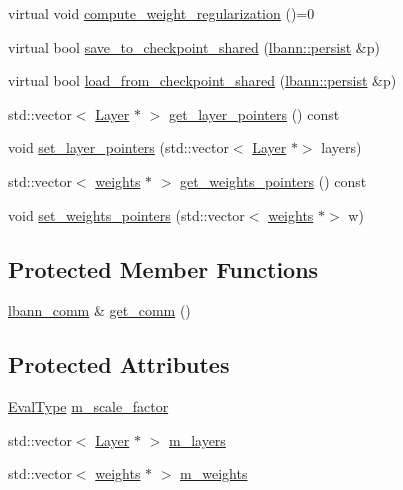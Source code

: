 \begin{DoxyCompactItemize}
\item 
virtual void \hyperlink{classlbann_1_1objective__function__term_a134cf89caed45527bbe9d811a0b93dfc}{compute\+\_\+weight\+\_\+regularization} ()=0
\item 
virtual bool \hyperlink{classlbann_1_1objective__function__term_a4451a6a6fb4d70ac2aed2827f075cd71}{save\+\_\+to\+\_\+checkpoint\+\_\+shared} (\hyperlink{classlbann_1_1persist}{lbann\+::persist} \&p)
\item 
virtual bool \hyperlink{classlbann_1_1objective__function__term_aac2240c9925c2b7bf436072a24f3eb30}{load\+\_\+from\+\_\+checkpoint\+\_\+shared} (\hyperlink{classlbann_1_1persist}{lbann\+::persist} \&p)
\item 
std\+::vector$<$ \hyperlink{classlbann_1_1Layer}{Layer} $\ast$ $>$ \hyperlink{classlbann_1_1objective__function__term_aeeb85314738bec6e15877f68b3d422a0}{get\+\_\+layer\+\_\+pointers} () const
\item 
void \hyperlink{classlbann_1_1objective__function__term_a82656dfd81bf6b818b38d041d341bc3b}{set\+\_\+layer\+\_\+pointers} (std\+::vector$<$ \hyperlink{classlbann_1_1Layer}{Layer} $\ast$$>$ layers)
\item 
std\+::vector$<$ \hyperlink{classlbann_1_1weights}{weights} $\ast$ $>$ \hyperlink{classlbann_1_1objective__function__term_aea73505aed191bfb9336d9d46a69d586}{get\+\_\+weights\+\_\+pointers} () const
\item 
void \hyperlink{classlbann_1_1objective__function__term_aa8adaf01dd8bc535dd86f27fc53c276a}{set\+\_\+weights\+\_\+pointers} (std\+::vector$<$ \hyperlink{classlbann_1_1weights}{weights} $\ast$$>$ w)
\end{DoxyCompactItemize}
\subsection*{Protected Member Functions}
\begin{DoxyCompactItemize}
\item 
\hyperlink{classlbann_1_1lbann__comm}{lbann\+\_\+comm} \& \hyperlink{classlbann_1_1objective__function__term_a5f89b676a26a6b76ddc26563ac87beb9}{get\+\_\+comm} ()
\end{DoxyCompactItemize}
\subsection*{Protected Attributes}
\begin{DoxyCompactItemize}
\item 
\hyperlink{base_8hpp_a3266f5ac18504bbadea983c109566867}{Eval\+Type} \hyperlink{classlbann_1_1objective__function__term_a59a544b8ff0455ed5091de3bf0d81c3c}{m\+\_\+scale\+\_\+factor}
\item 
std\+::vector$<$ \hyperlink{classlbann_1_1Layer}{Layer} $\ast$ $>$ \hyperlink{classlbann_1_1objective__function__term_a9269cf0a237eacd1e220ba2739f44334}{m\+\_\+layers}
\item 
std\+::vector$<$ \hyperlink{classlbann_1_1weights}{weights} $\ast$ $>$ \hyperlink{classlbann_1_1objective__function__term_a1d601c29153ae9cb54c585887608f2bf}{m\+\_\+weights}
\end{DoxyCompactItemize}
